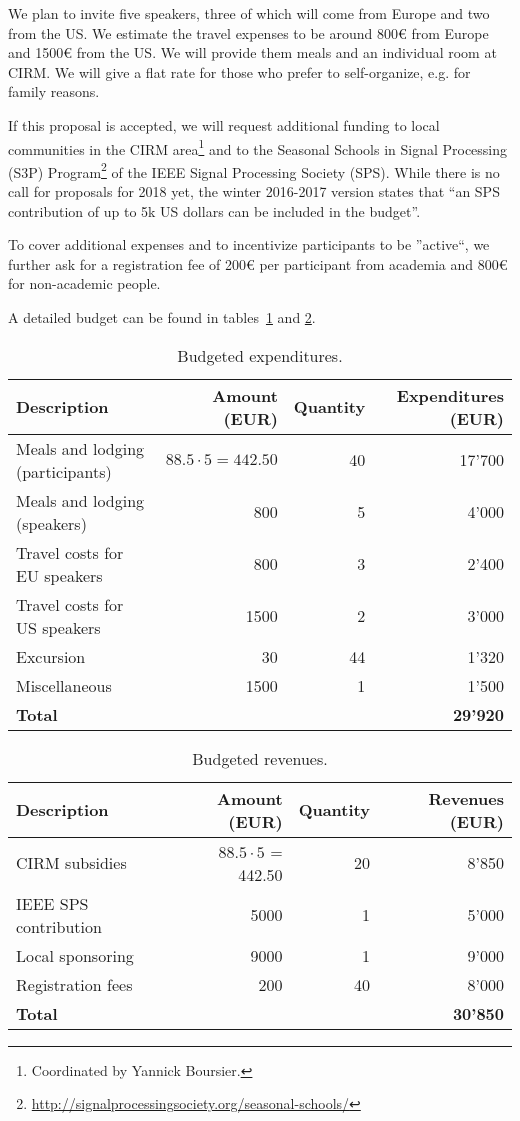 \documentclass[a4paper]{scrartcl}
\begin{document}
We plan to invite five speakers, three of which will come from Europe and two
from the US. We estimate the travel expenses to be around 800€ from Europe and
1500€ from the US. We will provide them meals and an individual room at CIRM.
We will give a flat rate for those who prefer to self-organize, e.g. for family
reasons.

If this proposal is accepted, we will request additional funding to local
communities in the CIRM area\footnote{Coordinated by Yannick Boursier.} and to
the Seasonal Schools in Signal Processing (S3P)
Program\footnote{\url{http://signalprocessingsociety.org/seasonal-schools/}} of
the IEEE Signal Processing Society (SPS). While there is no call for proposals
for 2018 yet, the winter 2016-2017 version states that ``an SPS contribution of
up to 5k US dollars can be included in the budget''.

To cover additional expenses and to incentivize participants to be ''active``,
we further ask for a registration fee of 200€ per participant from academia and
800€ for non-academic people.

A detailed budget can be found in tables~\ref{tab:expenditures} and
\ref{tab:revenues}.

\begin{table}[ht]
	\centering
	\begin{tabular}{|l|r|r|r|}
	\hline
	Description & Amount (EUR) & Quantity & Expenditures (EUR) \\
	\hline
	Meals and lodging (participants) & $88.5\cdot5=442.50$ & 40 & 17'700 \\
	Meals and lodging (speakers) & 800 & 5 & 4'000 \\
	Travel costs for EU speakers & 800  & 3 & 2'400 \\
	Travel costs for US speakers & 1500 & 2 & 3'000 \\
	Excursion & 30 & 44 & 1'320 \\
	Miscellaneous & 1500 & 1 & 1'500 \\
	\hline
	\multicolumn{3}{|l|}{\textbf{Total}} & \textbf{29'920} \\
	\hline
	\end{tabular}
	\caption{Budgeted expenditures.}
	\label{tab:expenditures}
\end{table}

\begin{table}[ht]
	\centering
	\begin{tabular}{|l|r|r|r|}
	\hline
	Description & Amount (EUR) & Quantity & Revenues (EUR) \\
	\hline
	CIRM subsidies & $88.5 \cdot 5$ = 442.50 & 20 & 8'850 \\
	IEEE SPS contribution & 5000 & 1 & 5'000 \\
	Local sponsoring & 9000  & 1 & 9'000 \\
	Registration fees & 200 & 40 & 8'000 \\
	\hline
	\multicolumn{3}{|l|}{\textbf{Total}} & \textbf{30'850} \\
	\hline
	\end{tabular}
	\caption{Budgeted revenues.}
	\label{tab:revenues}
\end{table}

\printbibliography
\end{document}
